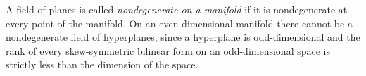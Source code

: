 A field of planes is called \textit{nondegenerate on a manifold} if it is nondegenerate at every point of the manifold. On an even-dimensional manifold there cannot be a nondegenerate field of hyperplanes, since a hyperplane is odd-dimensional and the rank of every skew-symmetric bilinear form on an odd-dimensional space is strictly less than the dimension of the space.
